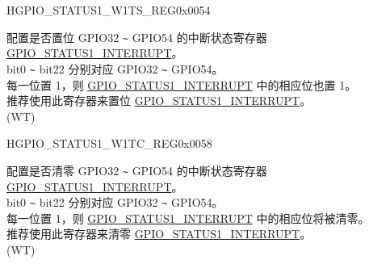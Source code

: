 \begin{register}{H}{GPIO\_STATUS1\_W1TS\_REG}{0x0054}\label{regdesc:GPIOSTATUS1W1TSREG}
%
%
\regnewline%
\begin{regdesc}\begin{reglist}
\label{fielddesc:GPIOSTATUS1W1TS}\item [GPIO\_STATUS1\_W1TS] 配置是否置位 GPIO32 \verb+~+ GPIO54 的中断状态寄存器 \hyperref[fielddesc:GPIOSTATUS1INTERRUPT]{GPIO\_STATUS1\_INTERRUPT}。\\
bit0 \verb+~+ bit22 分别对应 GPIO32 \verb+~+ GPIO54。\\
每一位置 1，则  \hyperref[fielddesc:GPIOSTATUS1INTERRUPT]{GPIO\_STATUS1\_INTERRUPT} 中的相应位也置 1。\\
推荐使用此寄存器来置位  \hyperref[fielddesc:GPIOSTATUS1INTERRUPT]{GPIO\_STATUS1\_INTERRUPT}。\\
(WT)
\end{reglist}\end{regdesc}
\end{register}


\begin{register}{H}{GPIO\_STATUS1\_W1TC\_REG}{0x0058}\label{regdesc:GPIOSTATUS1W1TCREG}
%
%
\regnewline%
\begin{regdesc}\begin{reglist}
\label{fielddesc:GPIOSTATUS1W1TC}\item [GPIO\_STATUS1\_W1TC] 配置是否清零 GPIO32 \verb+~+ GPIO54 的中断状态寄存器  \hyperref[fielddesc:GPIOSTATUS1INTERRUPT]{GPIO\_STATUS1\_INTERRUPT}。\\
bit0 \verb+~+ bit22 分别对应 GPIO32 \verb+~+ GPIO54。 \\
每一位置 1，则  \hyperref[fielddesc:GPIOSTATUS1INTERRUPT]{GPIO\_STATUS1\_INTERRUPT} 中的相应位将被清零。\\
推荐使用此寄存器来清零  \hyperref[fielddesc:GPIOSTATUS1INTERRUPT]{GPIO\_STATUS1\_INTERRUPT}。\\
(WT)
\end{reglist}\end{regdesc}
\end{register}


